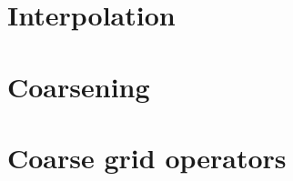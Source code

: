 \documentclass[18pt,xcolor=table]{beamer}
\begin{document}


\section{Interpolation}

\begin{frame}{}
\begin{block}{}
\bit
\item 
\eit
\end{block}
\end{frame}



\section{Coarsening}

\begin{frame}{}
\begin{block}{}
\bit
\item 
\eit
\end{block}
\end{frame}



\section{Coarse grid operators}

\begin{frame}{}
\begin{block}{}
\bit
\item 
\eit
\end{block}
\end{frame}


\end{document}
